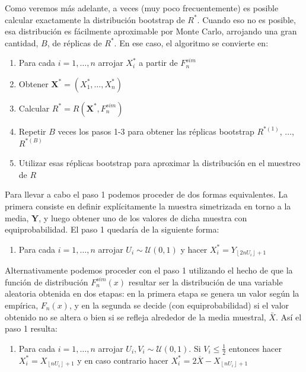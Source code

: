 \documentclass[]{book}
\providecommand{\tightlist}{%
  \setlength{\itemsep}{0pt}\setlength{\parskip}{0pt}}
\theoremstyle{definition}
\theoremstyle{definition}
\theoremstyle{definition}
\theoremstyle{remark}
\begin{document}
Como veremos más adelante, a veces (muy poco frecuentemente) es posible
calcular exactamente la distribución bootstrap de \(R^{\ast}\). Cuando
eso no es posible, esa distribución es fácilmente aproximable por Monte
Carlo, arrojando una gran cantidad, \(B\), de réplicas de \(R^{\ast}\).
En ese caso, el algoritmo se convierte en:

\begin{enumerate}
\def\labelenumi{\arabic{enumi}.}
\item
  Para cada \(i=1,\ldots ,n\) arrojar \(X_i^{\ast}\) a partir de
  \(F_n^{sim}\)
\item
  Obtener
  \(\mathbf{X}^{\ast}=\left( X_1^{\ast},\ldots ,X_n^{\ast} \right)\)
\item
  Calcular \(R^{\ast}=R\left( \mathbf{X}^{\ast},F_n^{sim} \right)\)
\item
  Repetir \(B\) veces los pasos 1-3 para obtener las réplicas bootstrap
  \(R^{\ast (1)}\), \(\ldots\), \(R^{\ast (B)}\)
\item
  Utilizar esas réplicas bootstrap para aproximar la distribución en el
  muestreo de \(R\)
\end{enumerate}

Para llevar a cabo el paso 1 podemos proceder de dos formas
equivalentes. La primera consiste en definir explícitamente la muestra
simetrizada en torno a la media, \(\mathbf{Y}\), y luego obtener uno de
los valores de dicha muestra con equiprobabilidad. El paso 1 quedaría de
la siguiente forma:

\begin{enumerate}
\def\labelenumi{\arabic{enumi}.}
\tightlist
\item
  Para cada \(i=1,\ldots ,n\) arrojar
  \(U_i\sim \mathcal{U}\left( 0,1 \right)\) y hacer
  \(X_i^{\ast}=Y_{\left\lfloor 2nU_i\right\rfloor +1}\)
\end{enumerate}

Alternativamente podemos proceder con el paso 1 utilizando el hecho de
que la función de distribución \(F_n^{sim}\left( x \right)\) resultar
ser la distribución de una variable aleatoria obtenida en dos etapas: en
la primera etapa se genera un valor según la empírica,
\(F_n\left( x \right)\), y en la segunda se decide (con
equiprobabilidad) si el valor obtenido no se altera o bien si se refleja
alrededor de la media muestral, \(\bar{X}\). Así el paso 1 resulta:

\begin{enumerate}
\def\labelenumi{\arabic{enumi}.}
\tightlist
\item
  Para cada \(i=1,\ldots ,n\) arrojar
  \(U_i,V_i\sim \mathcal{U}\left( 0,1 \right)\). Si
  \(V_i\leq \frac{1}{2}\) entonces hacer
  \(X_i^{\ast}=X_{\left\lfloor nU_i\right\rfloor +1}\) y en caso
  contrario hacer
  \(X_i^{\ast}=2\overline{X }-X_{\left\lfloor nU_i\right\rfloor +1}\)
\end{enumerate}
\end{document}
